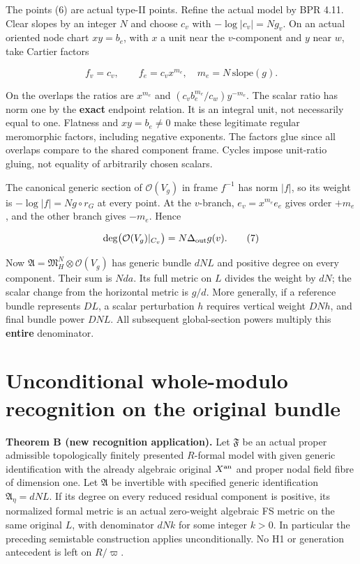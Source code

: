 \documentclass[
  11pt,
]{article}
\begin{document}
The points (6) are actual type-II points. Refine the actual model by BPR
4.11. Clear slopes by an integer \(N\) and choose \(c_v\) with
\(-\log|c_v|=Ng_v\). On an actual oriented node chart \(xy=b_e\), with
\(x\) a unit near the \(v\)-component and \(y\) near \(w\), take Cartier
factors

\[
 f_v=c_v,\qquad f_e=c_vx^{m_e},\quad m_e=N\,\text{slope}(g).
\]

On the overlaps the ratios are \(x^{m_e}\) and
\((c_vb_e^{m_e}/c_w)y^{-m_e}\). The scalar ratio has norm one by the
\textbf{exact} endpoint relation. It is an integral unit, not
necessarily equal to one. Flatness and \(xy=b_e\ne0\) make these
legitimate regular meromorphic factors, including negative exponents.
The factors glue since all overlaps compare to the shared component
frame. Cycles impose unit-ratio gluing, not equality of arbitrarily
chosen scalars.

The canonical generic section of \(\mathcal O(V_g)\) in frame \(f^{-1}\)
has norm \(|f|\), so its weight is \(-\log|f|=Ng\circ r_G\) at every
point. At the \(v\)-branch, \(e_v=x^{m_e}e_e\) gives order \(+m_e\), and
the other branch gives \(-m_e\). Hence

\[
 \deg\bigl(\mathcal O(V_g)|_{C_v}\bigr)=N\Delta_{
 \rm out}g(v).                                                     \tag{7}
\]

Now \(\mathfrak A=\mathfrak M_H^N\otimes\mathcal O(V_g)\) has generic
bundle \(dNL\) and positive degree on every component. Their sum is
\(Nda\). Its full metric on \(L\) divides the weight by \(dN\); the
scalar change from the horizontal metric is \(g/d\). More generally, if
a reference bundle represents \(DL\), a scalar perturbation \(h\)
requires vertical weight \(DN h\), and final bundle power \(DN L\). All
subsequent global-section powers multiply this \textbf{entire}
denominator.

\section{Unconditional whole-modulo recognition on the original
bundle}\label{unconditional-whole-modulo-recognition-on-the-original-bundle}

\textbf{Theorem B (new recognition application).} Let \(\mathfrak F\) be
an actual proper admissible topologically finitely presented
\(R\)-formal model with given generic identification with the already
algebraic original \(X^{\rm an}\) and proper nodal field fibre of
dimension one. Let \(\mathfrak A\) be invertible with specified generic
identification \(\mathfrak A_\eta=dNL\). If its degree on every reduced
residual component is positive, its normalized formal metric is an
actual zero-weight algebraic FS metric on the same original \(L\), with
denominator \(dNk\) for some integer \(k>0\). In particular the
preceding semistable construction applies unconditionally. No H1 or
generation antecedent is left on \(R/\varpi\).
\end{document}
